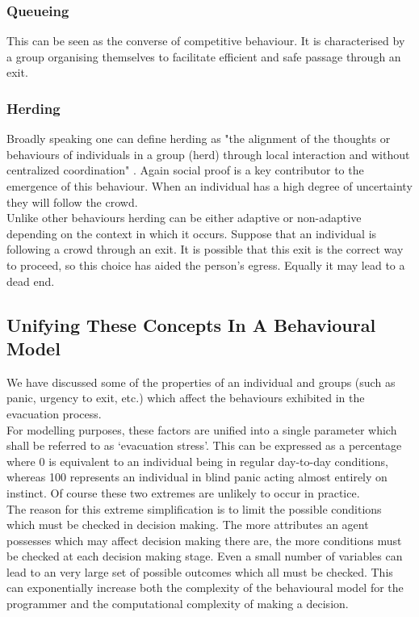 \subsubsection{Queueing}
This can be seen as the converse of competitive behaviour. It is characterised by a group organising themselves to facilitate efficient and safe passage through an exit.
\subsubsection{Herding}
Broadly speaking one can define herding as "the alignment of the thoughts or behaviours of individuals in a group (herd) through local interaction and without centralized coordination" \cite{HerdingInHumans}. Again social proof is a key contributor to the emergence of this behaviour. When an individual has a high degree of uncertainty they will follow the crowd.\\
Unlike other behaviours herding can be either adaptive or non-adaptive depending on the context in which it occurs. Suppose that an individual is following a crowd through an exit. It is possible that this exit is the correct way to proceed, so this choice has aided the person's egress. Equally it may lead to a dead end.

\subsection{Unifying These Concepts In A Behavioural Model}
We have discussed some of the properties of an individual and groups (such as panic, urgency to exit, etc.) which affect the behaviours exhibited in the evacuation process.\\
For modelling purposes, these factors are unified into a single parameter which shall be referred to as `evacuation stress'. This can be expressed as a percentage where 0 is equivalent to an individual being in regular day-to-day conditions, whereas 100 represents an individual in blind panic acting almost entirely on instinct. Of course these two extremes are unlikely to occur in practice.\\
The reason for this extreme simplification is to limit the possible conditions which must be checked in decision making. The more attributes an agent possesses which may affect decision making there are, the more conditions must be checked at each decision making stage. Even a small number of variables can lead to an very large set of possible outcomes which all must be checked. This can exponentially increase both the complexity of the behavioural model for the programmer and the computational complexity of making a decision.
